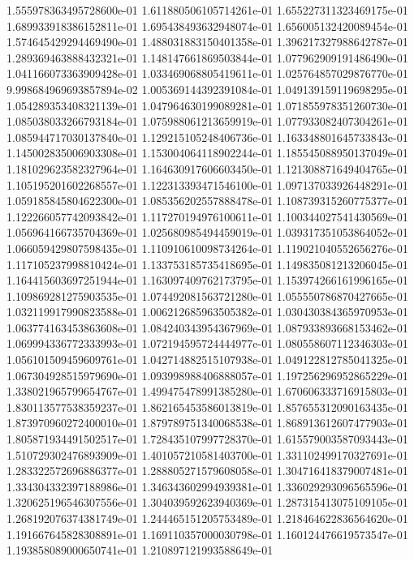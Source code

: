 1.555978363495728600e-01
1.611880506105714261e-01
1.655227311323469175e-01
1.689933918386152811e-01
1.695438493632948074e-01
1.656005132420089454e-01
1.574645429294469490e-01
1.488031883150401358e-01
1.396217327988642787e-01
1.289369463888432321e-01
1.148147661869503844e-01
1.077962909191486490e-01
1.041166073363909428e-01
1.033469068805419611e-01
1.025764857029876770e-01
9.998684969693857894e-02
1.005369144392391084e-01
1.049139159119698295e-01
1.054289353408321139e-01
1.047964630199089281e-01
1.071855978351260730e-01
1.085038033266793184e-01
1.075988061213659919e-01
1.077933082407304261e-01
1.085944717030137840e-01
1.129215105248406736e-01
1.163348801645733843e-01
1.145002835006903308e-01
1.153004064118902244e-01
1.185545088950137049e-01
1.181029623582327964e-01
1.164630917606603450e-01
1.121308871649404765e-01
1.105195201602268557e-01
1.122313393471546100e-01
1.097137033926448291e-01
1.059185845804622300e-01
1.085356202557888478e-01
1.108739315260775377e-01
1.122266057742093842e-01
1.117270194976100611e-01
1.100344027541430569e-01
1.056964166735704369e-01
1.025680985494459019e-01
1.039317351053864052e-01
1.066059429807598435e-01
1.110910610098734264e-01
1.119021040552656276e-01
1.117105237998810424e-01
1.133753185735418695e-01
1.149835081213206045e-01
1.164415603697251944e-01
1.163097409762173795e-01
1.153974266161996165e-01
1.109869281275903535e-01
1.074492081563721280e-01
1.055550786870427665e-01
1.032119917990823588e-01
1.006212685963505382e-01
1.030430384365970953e-01
1.063774163453863608e-01
1.084240343954367969e-01
1.087933893668153462e-01
1.069994336772333993e-01
1.072194595724444977e-01
1.080558607112346303e-01
1.056101509459609761e-01
1.042714882515107938e-01
1.049122812785041325e-01
1.067304928515979690e-01
1.093998988406888057e-01
1.197256296952865229e-01
1.338021965799654767e-01
1.499475478991385280e-01
1.670606333716915803e-01
1.830113577538359237e-01
1.862165453586013819e-01
1.857655312090163435e-01
1.873970960272400010e-01
1.879789751340068538e-01
1.868913612607477903e-01
1.805871934491502517e-01
1.728435107997728370e-01
1.615579003587093443e-01
1.510729302476893909e-01
1.401057210581403700e-01
1.331102499170327691e-01
1.283322572696886377e-01
1.288805271579608058e-01
1.304716418379007481e-01
1.334304332397188986e-01
1.346343602994939381e-01
1.336029293096565596e-01
1.320625196546307556e-01
1.304039592623940369e-01
1.287315413075109105e-01
1.268192076374381749e-01
1.244465151205753489e-01
1.218464622836564620e-01
1.191667645828308891e-01
1.169110357000030798e-01
1.160124476619573547e-01
1.193858089000650741e-01
1.210897121993588649e-01
